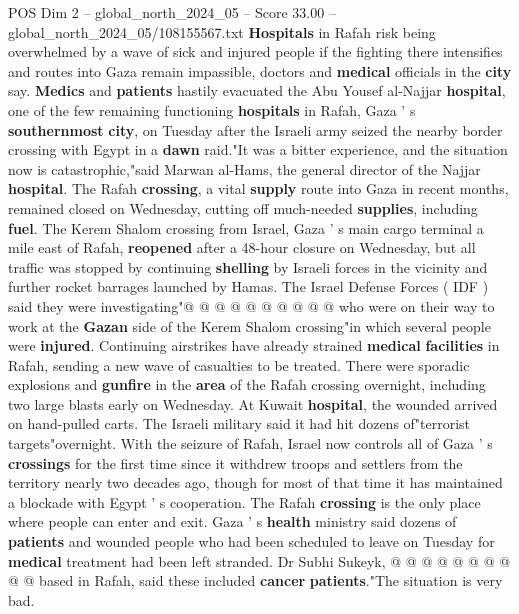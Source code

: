 \begin{textsample}{POS Dim 2 – global\_north\_2024\_05 – Score 33.00 – global\_north\_2024\_05/108155567.txt}  \label{ex:f2_pos_293}
\textbf{Hospitals} in Rafah risk being overwhelmed by a wave of sick and injured people if the fighting there intensifies and routes into Gaza remain impassible, doctors and \textbf{medical} officials in the \textbf{city} say. \textbf{Medics} and \textbf{patients} hastily evacuated the Abu Yousef al-Najjar \textbf{hospital}, one of the few remaining functioning \textbf{hospitals} in Rafah, Gaza ' s \textbf{southernmost} \textbf{city}, on Tuesday after the Israeli army seized the nearby border crossing with Egypt in a \textbf{dawn} raid."It was a bitter experience, and the situation now is catastrophic,"said Marwan al-Hams, the general director of the Najjar \textbf{hospital}.
The Rafah \textbf{crossing}, a vital \textbf{supply} route into Gaza in recent months, remained closed on Wednesday, cutting off much-needed \textbf{supplies}, including \textbf{fuel}.
The Kerem Shalom crossing from Israel, Gaza ' s main cargo terminal a mile east of Rafah, \textbf{reopened} after a 48-hour closure on Wednesday, but all traffic was stopped by continuing \textbf{shelling} by Israeli forces in the vicinity and further rocket barrages launched by Hamas.
The Israel Defense Forces ( IDF ) said they were investigating"@ @ @ @ @ @ @ @ @ @ who were on their way to work at the \textbf{Gazan} side of the Kerem Shalom crossing"in which several people were \textbf{injured}.
Continuing airstrikes have already strained \textbf{medical} \textbf{facilities} in Rafah, sending a new wave of casualties to be treated.
There were sporadic explosions and \textbf{gunfire} in the \textbf{area} of the Rafah crossing overnight, including two large blasts early on Wednesday.
At Kuwait \textbf{hospital}, the wounded arrived on hand-pulled carts.
The Israeli military said it had hit dozens of"terrorist targets"overnight.
With the seizure of Rafah, Israel now controls all of Gaza ' s \textbf{crossings} for the first time since it withdrew troops and settlers from the territory nearly two decades ago, though for most of that time it has maintained a blockade with Egypt ' s cooperation.
The Rafah \textbf{crossing} is the only place where people can enter and exit.
Gaza ' s \textbf{health} ministry said dozens of \textbf{patients} and wounded people who had been scheduled to leave on Tuesday for \textbf{medical} treatment had been left stranded.
Dr Subhi Sukeyk, @ @ @ @ @ @ @ @ @ @ based in Rafah, said these included \textbf{cancer} \textbf{patients}."The situation is very bad.

\end{textsample}
